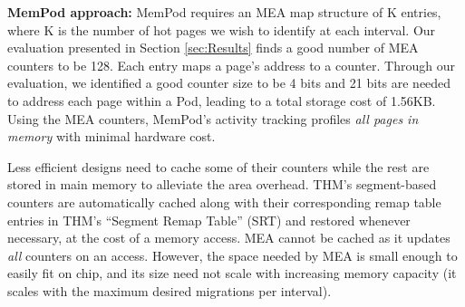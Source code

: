 	\textbf{MemPod approach:} MemPod requires an MEA map structure of K entries, where K is the number of hot pages we wish to identify at each interval. Our evaluation presented in Section \ref{sec:Results} finds a good number of MEA counters to be 128. Each entry maps a page's address to a counter. Through our evaluation, we identified a good counter size to be 4 bits and 21 bits are needed to address each page within a Pod, leading to a total storage cost of 1.56KB. Using the MEA counters, MemPod's activity tracking profiles \textit{all pages in memory} with minimal hardware cost. 

	

Less efficient designs need to cache some of their counters while the rest are stored in main memory to alleviate the area overhead. THM's segment-based 
counters are automatically cached along with their corresponding remap table entries in THM's ``Segment Remap Table'' (SRT) and restored whenever necessary, at the cost of a memory access. 
MEA cannot be cached as it updates \textit{all} counters on an access. 
However, the space needed by MEA is small enough to easily fit on chip,
and its size need not scale with increasing memory capacity (it scales with
the maximum desired migrations per interval).


